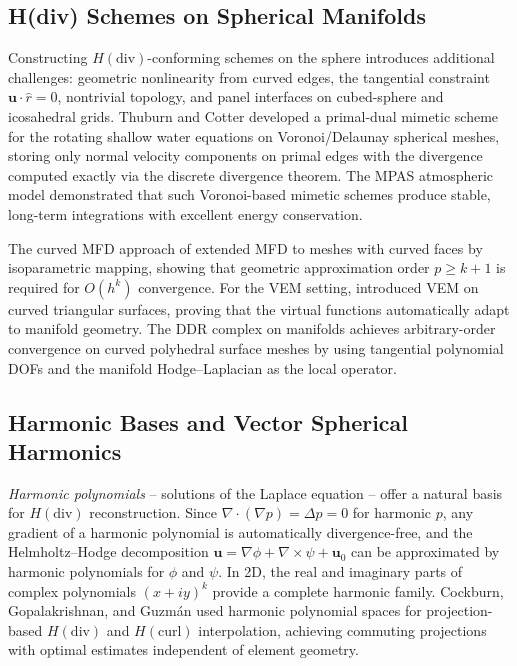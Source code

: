 \subsection{H(div) Schemes on Spherical Manifolds}

Constructing $H(\mathrm{div})$-conforming schemes on the sphere introduces
additional challenges: geometric nonlinearity from curved edges, the tangential
constraint $\mathbf{u}\cdot\hat{r}=0$, nontrivial topology, and panel
interfaces on cubed-sphere and icosahedral grids.  Thuburn and Cotter
\cite{thuburn2012primal} developed a primal-dual mimetic scheme for the
rotating shallow water equations on Voronoi/Delaunay spherical meshes,
storing only normal velocity components on primal edges with the divergence
computed exactly via the discrete divergence theorem.  The MPAS atmospheric
model \cite{ringler2010unified} demonstrated that such Voronoi-based mimetic
schemes produce stable, long-term integrations with excellent energy
conservation.

The curved MFD approach of \cite{lipnikovCurvedMFD2023} extended MFD to
meshes with curved faces by isoparametric mapping, showing that geometric
approximation order $p\ge k+1$ is required for $O(h^k)$ convergence.
For the VEM setting, \cite{veigaCurvedVEM2019} introduced VEM on curved
triangular surfaces, proving that the virtual functions automatically adapt
to manifold geometry.  The DDR complex on manifolds
\cite{dipietroManifold2024} achieves arbitrary-order convergence on curved
polyhedral surface meshes by using tangential polynomial DOFs and the
manifold Hodge--Laplacian as the local operator.

\subsection{Harmonic Bases and Vector Spherical Harmonics}

\emph{Harmonic polynomials} -- solutions of the Laplace equation -- offer a
natural basis for $H(\mathrm{div})$ reconstruction.  Since
$\nabla\cdot(\nabla p) = \Delta p = 0$ for harmonic $p$, any gradient of a
harmonic polynomial is automatically divergence-free, and the
Helmholtz--Hodge decomposition $\mathbf{u} = \nabla\phi +
\nabla\times\psi + \mathbf{u}_0$ can be approximated by harmonic
polynomials for $\phi$ and $\psi$.  In 2D, the real and imaginary parts of
complex polynomials $(x+iy)^k$ provide a complete harmonic family.
Cockburn, Gopalakrishnan, and Guzm\'{a}n \cite{cockburnHarmonic2010} used
harmonic polynomial spaces for projection-based $H(\mathrm{div})$ and
$H(\mathrm{curl})$ interpolation, achieving commuting projections with
optimal estimates independent of element geometry.

